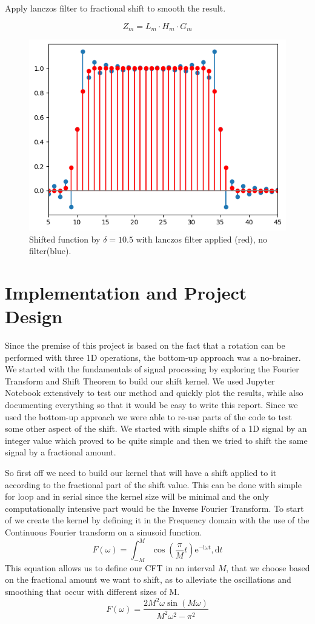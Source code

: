 \documentclass[]{usiinfbachelorproject}
\begin{document}
	Apply lanczos filter to fractional shift to smooth the result.
	
	\begin{equation*}
		Z_m = L_m \cdot H_m \cdot G_m
	\end{equation*}
	
	\begin{figure}[h]
		\centering
		\includegraphics[width=0.5\columnwidth]{images/box_shifted_lanczos_delta10_1_n50.png}
		\caption{Shifted function by $\delta=10.5$ with lanczos filter applied (red), no filter(blue).}
	\end{figure}
	
	\fi
	
	\newpage
	
	\section{Implementation and Project Design}
		Since the premise of this project is based on the fact that a rotation can be performed with three 1D operations, the bottom-up approach was a no-brainer. We started with the fundamentals of signal processing by exploring the Fourier Transform and Shift Theorem to build our shift kernel. We used Jupyter Notebook extensively to test our method and quickly plot the results, while also documenting everything so that it would be easy to write this report. Since we used the bottom-up approach we were able to re-use parts of the code to test some other aspect of the shift. We started with simple shifts of a 1D signal by an integer value which proved to be quite simple and then we tried to shift the same signal by a fractional amount.
		
		So first off we need to build our kernel that will have a shift applied to it according to the fractional part of the shift value. This can be done with simple for loop and in serial since the kernel size will be minimal and the only computationally intensive part would be the Inverse Fourier Transform. 
		To start of we create the kernel by defining it in the Frequency domain with the use of the Continuous Fourier transform on a sinusoid function.
		\begin{equation}
			F(\omega) = \int_{-M}^{M} \cos(\frac{\pi}{M}t)\mathrm{e}^{-\mathrm{i}\omega t},\mathrm{d}t
		\end{equation}
		This equation allows us to define our CFT in an interval $M$, that we choose based on the fractional amount we want to shift, as to alleviate the oscillations and smoothing that occur with different sizes of M.
		\begin{equation}
			F(\omega) = \frac{2M^2\omega \sin(M\omega)}{M^2\omega^2-\pi^2}
		\end{equation}
		
\end{document}
